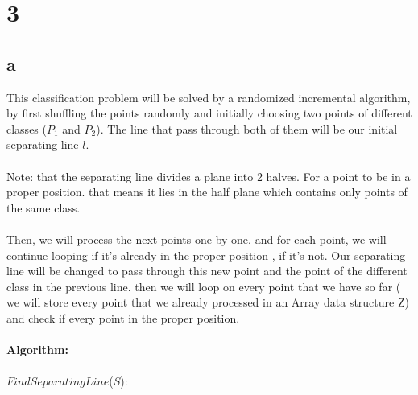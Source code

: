 \section*{3}
\subsection*{a}

This classification problem will be solved by a randomized incremental algorithm, by first shuffling the points randomly and initially choosing two points of different classes 
($P_1$ and $P_2$). The line that pass through both  of them will be our initial separating line $l$. \\
\\
Note: that the separating line divides a plane into 2 halves. For a point to be in a proper position. that means it lies in the half plane which contains only points of the same class. \\
\\
Then, we will process the next points one by one. and for each point, we will continue looping if it's already in the proper position , if it's not. Our separating line will be changed to pass through this new point and the point of the different class in the previous line. then we will loop on every point that we have so far ( we will store every point that we already processed in an Array data structure Z) and check if every point in the proper position. 
\\
\\
\textbf{Algorithm:}\\
\\
$FindSeparatingLine$($S$):
